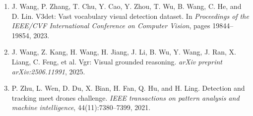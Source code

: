 \documentclass[11pt,a4paper]{article}
\begin{document}
\begin{enumerate}
    \item J. Wang, P. Zhang, T. Chu, Y. Cao, Y. Zhou, T. Wu, B. Wang, C. He, and D. Lin. V3det: Vast vocabulary visual detection dataset. In \textit{Proceedings of the IEEE/CVF International Conference on Computer Vision}, pages 19844–19854, 2023.
    \item J. Wang, Z. Kang, H. Wang, H. Jiang, J. Li, B. Wu, Y. Wang, J. Ran, X. Liang, C. Feng, et al. Vgr: Visual grounded reasoning. \textit{arXiv preprint arXiv:2506.11991}, 2025.
    \item P. Zhu, L. Wen, D. Du, X. Bian, H. Fan, Q. Hu, and H. Ling. Detection and tracking meet drones challenge. \textit{IEEE transactions on pattern analysis and machine intelligence}, 44(11):7380–7399, 2021.
\end{enumerate}
\end{document}
